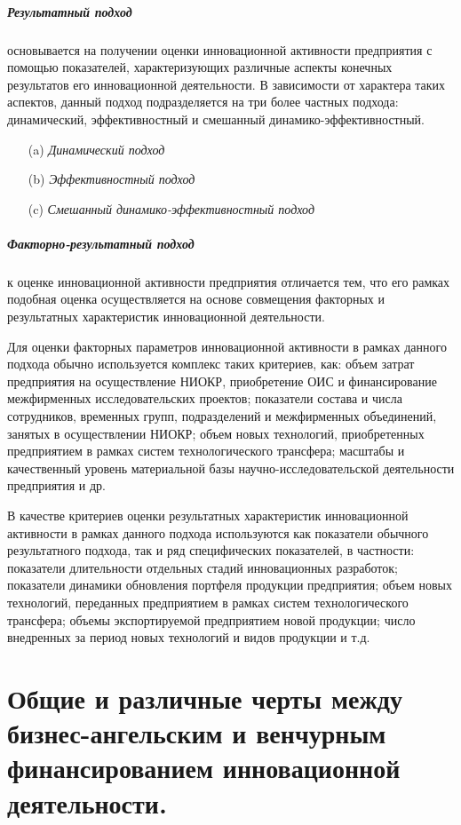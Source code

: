 \documentclass[11pt]{article}
\theoremstyle{plain} %
\theoremstyle{definition} %
\theoremstyle{remark} %
\begin{document}
\subparagraph{Результатный подход} основывается на получении оценки инновационной активности предприятия с помощью показателей, характеризующих различные аспекты конечных результатов его инновационной деятельности. В зависимости от характера таких аспектов, данный подход подразделяется на три более частных подхода: динамический, эффективностный и смешанный динамико-эффективностный.
\begin{itemize}
	\item[(a)] \textit{Динамический подход}
	\item[(b)] \textit{Эффективностный подход}
	\item[(c)] \textit{Смешанный динамико-эффективностный подход}
\end{itemize}

\subparagraph{Факторно-результатный подход}
к оценке инновационной активности предприятия отличается тем, что его рамках подобная оценка осуществляется на основе совмещения факторных и результатных характеристик инновационной деятельности.

Для оценки факторных параметров инновационной активности в рамках данного подхода обычно используется комплекс таких критериев, как: объем затрат предприятия на осуществление НИОКР, приобретение ОИС и финансирование межфирменных исследовательских проектов; показатели состава и числа сотрудников, временных групп, подразделений и межфирменных объединений, занятых в осуществлении НИОКР; объем новых технологий, приобретенных предприятием в рамках систем технологического трансфера; масштабы и качественный уровень материальной базы научно-исследовательской деятельности предприятия и др.

В качестве критериев оценки результатных характеристик инновационной активности в рамках данного подхода используются как показатели обычного результатного подхода, так и ряд специфических показателей, в частности: показатели длительности отдельных стадий инновационных разработок; показатели динамики обновления портфеля продукции предприятия; объем новых технологий, переданных предприятием в рамках систем технологического трансфера; объемы экспортируемой предприятием новой продукции; число внедренных за период новых технологий и видов продукции и т.д.

\newpage

\section{Общие и различные черты между бизнес-ангельским и венчурным финансированием инновационной деятельности.}\label{erste}
\end{document}

